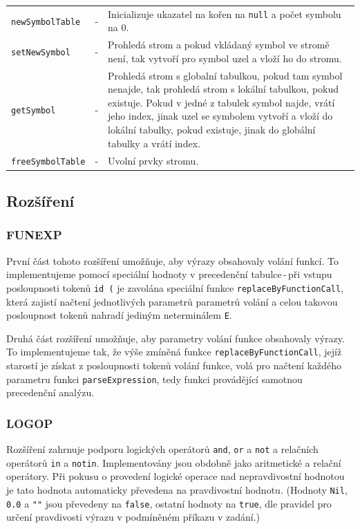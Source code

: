 \documentclass[12pt,a4paper,titlepage,final]{article}
\begin{document}
\begin{tabular}{llp{11.9cm}}
\texttt{newSymbolTable}  & - & Inicializuje ukazatel na kořen na \texttt{null} a počet symbolu na 0.\\
\texttt{setNewSymbol}    & - & Prohledá strom a pokud vkládaný symbol ve stromě není, 
                               tak vytvoří pro symbol uzel a vloží ho do stromu.\\                        
\texttt{getSymbol}       & - & Prohledá strom s globalní tabulkou, pokud tam symbol nenajde,  
                               tak prohledá strom s lokální tabulkou, pokud existuje.  
                               Pokud v jedné z tabulek symbol najde, vrátí jeho index, 
                               jinak uzel se symbolem vytvoří a vloží do lokální tabulky, 
                               pokud existuje, jinak do globální tabulky a vrátí index.\\
\texttt{freeSymbolTable} & - & Uvolní prvky stromu.\\
\end{tabular}
\subsection{Rozšíření}
\subsubsection{FUNEXP}
První část tohoto rozšíření umožňuje, aby výrazy obsahovaly volání funkcí. To
implementujeme pomocí speciální hodnoty v precedenční tabulce\,-\,při vstupu
posloupnosti tokenů \texttt{id (} je zavolána speciální funkce
\texttt{replaceByFunctionCall}, která zajistí načtení jednotlivých parametrů
parametrů volání a celou takovou posloupnost tokenů nahradí jediným
neterminálem \texttt{E}.

Druhá část rozšíření umožňuje, aby parametry volání funkce obsahovaly výrazy.
To implementujeme tak, že výše zmíněná funkce \texttt{replaceByFunctionCall},
jejíž starostí je získat z posloupnosti tokenů volání funkce, volá pro načtení
každého parametru funkci \texttt{parseExpression}, tedy funkci provádějící
samotnou precedenční analýzu.

\subsubsection{LOGOP}
Rozšíření zahrnuje podporu logických operátorů \texttt{and}, \texttt{or} a
\texttt{not} a relačních operátorů \texttt{in} a \texttt{notin}.
Implementovány jsou obdobně jako aritmetické a relační operátory. Při pokusu
o provedení logické operace nad nepravdivostní hodnotou je tato hodnota
automaticky převedena na pravdivostní hodnotu. (Hodnoty \texttt{Nil}, \texttt{0.0} a
\texttt{""} jsou převedeny na \texttt{false}, ostatní hodnoty na \texttt{true},
dle pravidel pro určení pravdivosti výrazu v podmíněném příkazu v zadání.)
\end{document}
